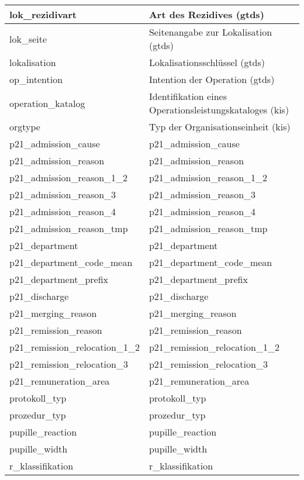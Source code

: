 \begin{longtable}{||p{5.3cm}|p{9cm}||}
  	lok\_rezidivart & Art des Rezidives (\ac{gtds})\\ \hline
  	lok\_seite & Seitenangabe zur Lokalisation (\ac{gtds}) \\ \hline
  	lokalisation & Lokalisationsschlüssel (\ac{gtds}) \\ \hline
  	op\_intention & Intention der Operation (\ac{gtds})\\ \hline
  	operation\_katalog & Identifikation eines Operationsleistungskataloges (\ac{kis})\\ \hline
  	orgtype & Typ der Organisationseinheit (\ac{kis})\\ \hline
  	p21\_admission\_cause & p21\_admission\_cause\\ \hline
  	p21\_admission\_reason & p21\_admission\_reason\\ \hline
  	p21\_admission\_reason\_1\_2 & p21\_admission\_reason\_1\_2\\ \hline
  	p21\_admission\_reason\_3 & p21\_admission\_reason\_3\\ \hline
  	p21\_admission\_reason\_4 & p21\_admission\_reason\_4\\ \hline
  	p21\_admission\_reason\_tmp & p21\_admission\_reason\_tmp\\ \hline
  	p21\_department & p21\_department\\ \hline
  	p21\_department\_code\_mean & p21\_department\_code\_mean\\ \hline
  	p21\_department\_prefix & p21\_department\_prefix\\ \hline
  	p21\_discharge & p21\_discharge\\ \hline
  	p21\_merging\_reason & p21\_merging\_reason\\ \hline
  	p21\_remission\_reason & p21\_remission\_reason\\ \hline
  	p21\_remission\_relocation\_1\_2 & p21\_remission\_relocation\_1\_2\\ \hline
  	p21\_remission\_relocation\_3 & p21\_remission\_relocation\_3\\ \hline
  	p21\_remuneration\_area & p21\_remuneration\_area\\ \hline
  	protokoll\_typ & protokoll\_typ\\ \hline
  	prozedur\_typ & prozedur\_typ\\ \hline
  	pupille\_reaction & pupille\_reaction\\ \hline
  	pupille\_width & pupille\_width\\ \hline
  	r\_klassifikation & r\_klassifikation\\ \hline

\end{longtable}
